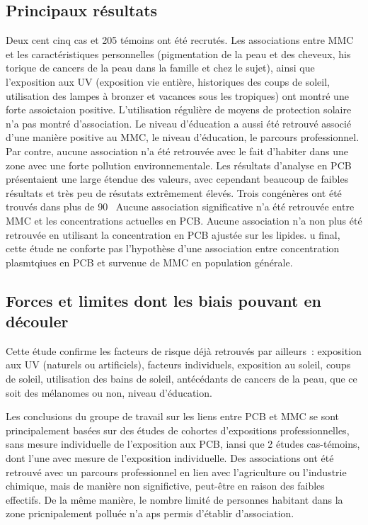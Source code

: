 \documentclass[10pt]{article}
\begin{document}
\subsection{Principaux résultats}
Deux cent cinq cas et 205 témoins ont été recrutés. Les associations entre MMC et les caractéristiques personnelles (pigmentation de la peau et des cheveux, his torique de cancers de la peau dans la famille et chez le sujet), ainsi que l'exposition aux UV (exposition vie entière, historiques des coups de soleil, utilisation des lampes à bronzer et vacances sous les tropiques) ont montré une forte assoictaion positive. L'utilisation régulière de moyens de protection solaire n'a pas montré d'association. Le niveau d'éducation a aussi été retrouvé associé d'une manière positive au MMC, le niveau d'éducation, le parcours professionnel. Par contre, aucune association n'a été retrouvée avec le fait d'habiter dans une zone avec une forte pollution environnementale.
Les résultats d'analyse en PCB présentaient une large étendue des valeurs, avec cependant beaucoup de faibles résultats et très peu de résutats extrêmement élevés. Trois congénères ont été trouvés dans plus de 90~%
Aucune association significative n'a été retrouvée entre MMC et les concentrations actuelles en PCB. Aucune association n'a non plus été retrouvée en utilisant la concentration en PCB ajustée sur les lipides. 
u final, cette étude ne conforte pas l'hypothèse d'une association entre concentration plasmtqiues en PCB et survenue de MMC en population générale.
\subsection{Forces et limites dont les biais pouvant en découler}
Cette étude confirme les facteurs de risque déjà retrouvés par ailleurs~: exposition aux UV (naturels ou artificiels), facteurs individuels, exposition au soleil, coups de soleil, utilisation des bains de soleil, antécédants de cancers de la peau, que ce soit des mélanomes ou non, niveau d'éducation. 

Les conclusions du groupe de travail sur les liens entre PCB et MMC se sont principalement basées sur des études de cohortes d'expositions professionnelles, sans mesure individuelle de l'exposition aux PCB, iansi que 2 études cas-témoins, dont l'une avec mesure de l'exposition individuelle. Des associations ont été retrouvé avec un parcours professionnel en lien avec l'agriculture ou l'industrie chimique, mais de manière non significtive, peut-être en raison des faibles effectifs. De la même manière, le nombre limité de personnes habitant dans la zone pricnipalement polluée n'a aps permis d'établir d'association.
\end{document}
